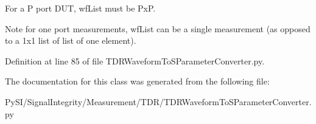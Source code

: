 For a P port D\+UT, wf\+List must be PxP. \begin{DoxyNote}{Note}
for one port measurements, wf\+List can be a single measurement (as opposed to a 1x1 list of list of one element). 
\end{DoxyNote}


Definition at line 85 of file T\+D\+R\+Waveform\+To\+S\+Parameter\+Converter.\+py.



The documentation for this class was generated from the following file\+:\begin{DoxyCompactItemize}
\item 
Py\+S\+I/\+Signal\+Integrity/\+Measurement/\+T\+D\+R/T\+D\+R\+Waveform\+To\+S\+Parameter\+Converter.\+py\end{DoxyCompactItemize}
